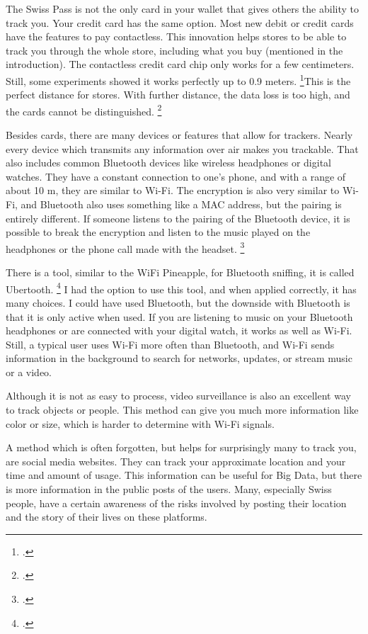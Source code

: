 \documentclass[paper=a4, fontsize=11pt]{article}
\begin{document}
The Swiss Pass is not the only card in your wallet that gives others the ability to track you. Your credit card has the same option. Most new debit or credit cards have the features to pay contactless. This innovation helps stores to be able to track you through the whole store, including what you buy (mentioned in the introduction). The contactless credit card chip only works for a few centimeters. Still, some experiments showed it works perfectly up to 0.9 meters. \footcite{contactlesspaymentsppp}This is the perfect distance for stores. With further distance, the data loss is too high, and the cards cannot be distinguished.
\footcite{contactlesspaymentspaper} 

Besides cards, there are many devices or features that allow for trackers. Nearly every device which transmits any information over air makes you trackable. That also includes common Bluetooth devices like wireless headphones or digital watches. They have a constant connection to one's phone, and with a range of about 10 m, they are similar to Wi-Fi. The encryption is also very similar to Wi-Fi, and Bluetooth also uses something like a MAC address, but the pairing is entirely different. If someone listens to the pairing of the Bluetooth device, it is possible to break the encryption and listen to the music played on the headphones or the phone call made with the headset. \footcite{ubertooth}

There is a tool, similar to the WiFi Pineapple, for Bluetooth sniffing, it is called Ubertooth. \footcite{ubertooth} I had the option to use this tool, and when applied correctly, it has many choices. I could have used Bluetooth, but the downside with Bluetooth is that it is only active when used. If you are listening to music on your Bluetooth headphones or are connected with your digital watch, it works as well as Wi-Fi. Still, a typical user uses Wi-Fi more often than Bluetooth, and Wi-Fi sends information in the background to search for networks, updates, or stream music or a video.

Although it is not as easy to process, video surveillance is also an excellent way to track objects or people. This method can give you much more information like color or size, which is harder to determine with Wi-Fi signals.

A method which is often forgotten, but helps for surprisingly many to track you, are social media websites. They can track your approximate location and your time and amount of usage. This information can be useful for Big Data, but there is more information in the public posts of the users. Many, especially Swiss people, have a certain awareness of the risks involved by posting their location and the story of their lives on these platforms.
\end{document}
